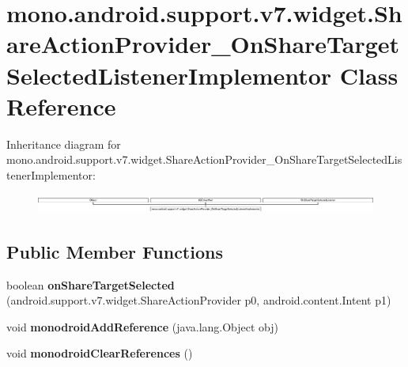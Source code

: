 \hypertarget{classmono_1_1android_1_1support_1_1v7_1_1widget_1_1ShareActionProvider__OnShareTargetSelectedListenerImplementor}{}\section{mono.\+android.\+support.\+v7.\+widget.\+Share\+Action\+Provider\+\_\+\+On\+Share\+Target\+Selected\+Listener\+Implementor Class Reference}
\label{classmono_1_1android_1_1support_1_1v7_1_1widget_1_1ShareActionProvider__OnShareTargetSelectedListenerImplementor}
Inheritance diagram for mono.\+android.\+support.\+v7.\+widget.\+Share\+Action\+Provider\+\_\+\+On\+Share\+Target\+Selected\+Listener\+Implementor\+:\begin{figure}[H]
\begin{center}
\leavevmode
\includegraphics[height=0.644790cm]{classmono_1_1android_1_1support_1_1v7_1_1widget_1_1ShareActionProvider__OnShareTargetSelectedListenerImplementor}
\end{center}
\end{figure}
\subsection*{Public Member Functions}
\begin{DoxyCompactItemize}
\item 
\hypertarget{classmono_1_1android_1_1support_1_1v7_1_1widget_1_1ShareActionProvider__OnShareTargetSelectedListenerImplementor_acd158ea7fad91d537c19f92888995fad}{}boolean {\bfseries on\+Share\+Target\+Selected} (android.\+support.\+v7.\+widget.\+Share\+Action\+Provider p0, android.\+content.\+Intent p1)\label{classmono_1_1android_1_1support_1_1v7_1_1widget_1_1ShareActionProvider__OnShareTargetSelectedListenerImplementor_acd158ea7fad91d537c19f92888995fad}

\item 
\hypertarget{classmono_1_1android_1_1support_1_1v7_1_1widget_1_1ShareActionProvider__OnShareTargetSelectedListenerImplementor_a56c3e72e0afae02044279e72744f2c14}{}void {\bfseries monodroid\+Add\+Reference} (java.\+lang.\+Object obj)\label{classmono_1_1android_1_1support_1_1v7_1_1widget_1_1ShareActionProvider__OnShareTargetSelectedListenerImplementor_a56c3e72e0afae02044279e72744f2c14}

\item 
\hypertarget{classmono_1_1android_1_1support_1_1v7_1_1widget_1_1ShareActionProvider__OnShareTargetSelectedListenerImplementor_a6365fd94f326b807c545489837189d68}{}void {\bfseries monodroid\+Clear\+References} ()\label{classmono_1_1android_1_1support_1_1v7_1_1widget_1_1ShareActionProvider__OnShareTargetSelectedListenerImplementor_a6365fd94f326b807c545489837189d68}

\end{DoxyCompactItemize}


